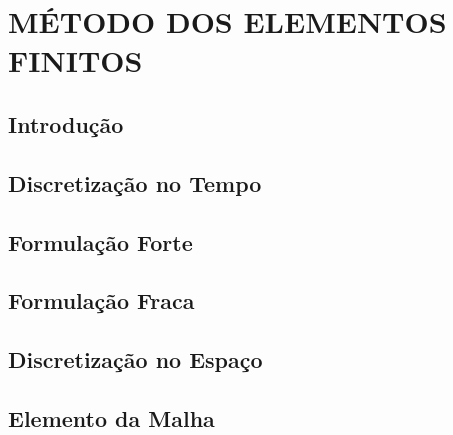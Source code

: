 \chapter{\textbf{MÉTODO DOS ELEMENTOS FINITOS}}
\label{metodo dos elementos finitos}

\section{\textbf{Introdução}} 


\section{\textbf{Discretização no Tempo}} 
\label{discretizacao tempo}



\section{\textbf{Formulação Forte}} 
\label{formulacao forte}



\section{\textbf{Formulação Fraca}} 
\label{formulacao fraca}



\section{\textbf{Discretização no Espaço}} 
\label{discretizacao espaco}



\section{\textbf{Elemento da Malha}} 
\label{elemento}



